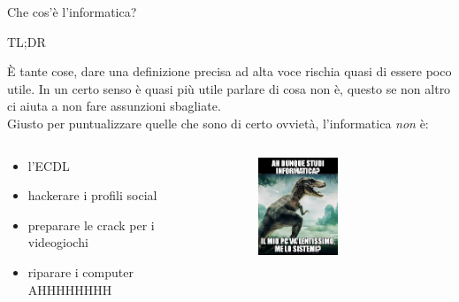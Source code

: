 \documentclass[aspectratio=1610]{beamer}
\begin{document}
	\begin{frame}[fragile]{Che cos'è l'informatica?}
		\pause
		\begin{center}
			\Large{TL;DR}\\
		\end{center}		
		È tante cose, dare una definizione precisa ad alta voce rischia quasi di essere poco utile. In un certo senso è quasi più utile parlare di cosa \alert<1>{non} è, questo se non altro ci aiuta a non fare assunzioni sbagliate.\\
		\bigskip
		\pause
		Giusto per puntualizzare quelle che sono di certo ovvietà, l'informatica \emph{non} è:
		\begin{columns}
			\begin{column}{0.55\textwidth}
				\begin{itemize}
					\item l'ECDL 
					\item hackerare i profili social 
					\item preparare le crack per i videogiochi 
					\item riparare i computer \Large{AHHHHHHHH} 
				\end{itemize}		
			\end{column}
			 {
				\begin{column}{0.4\textwidth}
					\begin{figure}
						\includegraphics[width=0.5\textwidth, keepaspectratio]{memino.jpg}	
					\end{figure}
				\end{column}
			}
		\end{columns}
	\end{frame}
\end{document}
